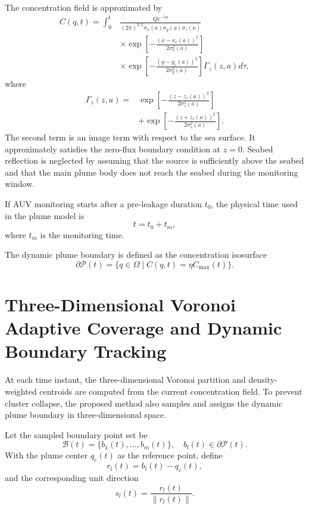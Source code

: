 \documentclass[conference]{IEEEtran}
\begin{document}
The concentration field is approximated by
\begin{equation}
\begin{aligned}
C(q,t)=\int_0^t
&\frac{Qe^{-\lambda a}}
{(2\pi)^{3/2}\sigma_x(a)\sigma_y(a)\sigma_z(a)} \\
&\times
\exp\left[-\frac{(x-x_c(a))^2}{2\sigma_x^2(a)}\right] \\
&\times
\exp\left[-\frac{(y-y_c(a))^2}{2\sigma_y^2(a)}\right]
\Gamma_z(z,a)d\tau,
\end{aligned}
\end{equation}
where
\begin{equation}
\begin{aligned}
\Gamma_z(z,a)=
&\exp\left[-\frac{(z-z_c(a))^2}{2\sigma_z^2(a)}\right] \\
&+
\exp\left[-\frac{(z+z_c(a))^2}{2\sigma_z^2(a)}\right].
\end{aligned}
\end{equation}
The second term is an image term with respect to the sea surface. It approximately satisfies the zero-flux boundary condition at $z=0$. Seabed reflection is neglected by assuming that the source is sufficiently above the seabed and that the main plume body does not reach the seabed during the monitoring window.

If AUV monitoring starts after a pre-leakage duration $t_0$, the physical time used in the plume model is
\begin{equation}
t=t_0+t_m,
\end{equation}
where $t_m$ is the monitoring time.

The dynamic plume boundary is defined as the concentration isosurface
\begin{equation}
\partial\mathcal{P}(t)=
\{q\in\Omega\mid C(q,t)=\eta C_{\max}(t)\}.
\end{equation}

\section{Three-Dimensional Voronoi Adaptive Coverage and Dynamic Boundary Tracking}
At each time instant, the three-dimensional Voronoi partition and density-weighted centroids are computed from the current concentration field. To prevent cluster collapse, the proposed method also samples and assigns the dynamic plume boundary in three-dimensional space.

Let the sampled boundary point set be
\begin{equation}
\mathcal{B}(t)=\{b_1(t),\ldots,b_m(t)\},\quad b_l(t)\in\partial\mathcal{P}(t).
\end{equation}
With the plume center $q_c(t)$ as the reference point, define
\begin{equation}
r_l(t)=b_l(t)-q_c(t),
\end{equation}
and the corresponding unit direction
\begin{equation}
s_l(t)=\frac{r_l(t)}{\|r_l(t)\|}.
\end{equation}
\end{document}
